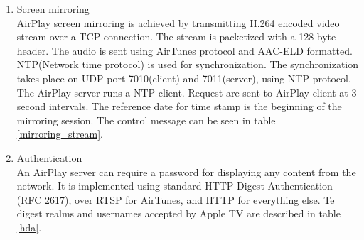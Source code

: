 \begin{enumerate}
\item Screen mirroring \\ 
AirPlay screen mirroring is achieved by transmitting H.264 encoded video stream 
over a TCP connection. The stream is packetized with a 128-byte header. The 
audio is sent using AirTunes protocol and AAC-ELD formatted. 
NTP(Network time protocol) is used for synchronization. The synchronization 
takes place on UDP port 7010(client) and 7011(server), using NTP protocol. The 
AirPlay server runs a NTP client. Request are sent to AirPlay client at 3 
second intervals. The reference date for time stamp is the beginning of the 
mirroring session.  The control message can be seen in table 
\ref{mirroring_stream}. 
\begin{table}[htb] 
\caption{AirPlay Mirroring Control HTTP requests \label{mirroring_stream}} 
\begin{center} 
\end{center} 
\end{table} 
\item Authentication \\ 
An AirPlay server can require a password for displaying any content from the 
network. It is implemented using standard HTTP Digest Authentication (RFC 2617), 
over RTSP for AirTunes, and HTTP for everything else. Te digest realms and 
usernames accepted by Apple TV are described in table \ref{hda}. 
\begin{table}[htb] 
\caption{AirPlay HTTP Digest Authentication \label{hda}} 
\begin{center} 
\end{center} 
\end{table} 
\end{enumerate} 

